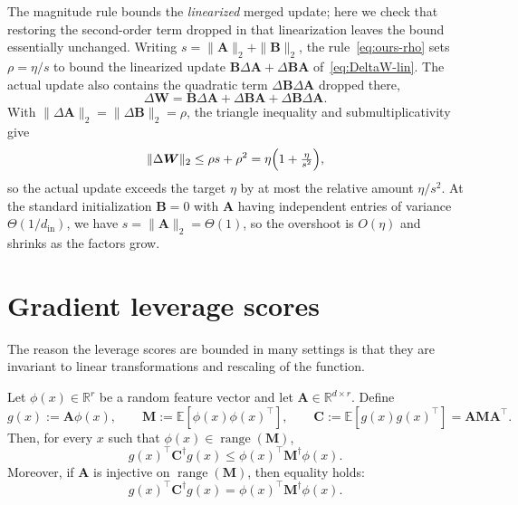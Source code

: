 \documentclass[11pt]{article}
\newcommand{\mat}[1]{\bm{#1}}
\newcommand{\norm}[1]{\| #1\|}
\begin{document}
\begin{remark}
\label{rem:quadratic}
The magnitude rule bounds the \emph{linearized} merged update; here we check that
restoring the second-order term dropped in that linearization leaves the bound
essentially unchanged. Writing $s=\norm{\mat{A}}_2+\norm{\mat{B}}_2$, the
rule~\eqref{eq:ours-rho} sets $\rho=\eta/s$ to bound the linearized update
$\mat{B}\Delta\mat{A}+\Delta\mat{B} \mat{A}$ of~\eqref{eq:DeltaW-lin}. The actual update also contains
the quadratic term $\Delta\mat{B}\Delta\mat{A}$ dropped there,
\[
  \Delta\mat{W} = \mat{B}\Delta\mat{A}+\Delta\mat{B} \mat{A}+\Delta\mat{B}\Delta\mat{A} .
\]
With $\norm{\Delta\mat{A}}_2=\norm{\Delta\mat{B}}_2=\rho$, the triangle inequality and
submultiplicativity give
\[
  \norm{\Delta\mat{W}}_2\le\rho s+\rho^2=\eta\Bigl(1+\tfrac{\eta}{s^2}\Bigr),
\]
so the actual update exceeds the target $\eta$ by at most the relative amount
$\eta/s^2$. At the standard initialization $\mat{B}=0$ with $\mat{A}$ having independent
entries of variance $\Theta(1/d_{\mathrm{in}})$, we have $s=\norm{\mat{A}}_2=\Theta(1)$,
so the overshoot is $O(\eta)$ and shrinks as the factors grow.
\end{remark}




\section{Gradient leverage scores} \label{asec:grad-leverage}


The reason the leverage scores are bounded in many settings is that they are invariant to linear transformations and rescaling of the function.

\begin{lemma} \label{lem:leverage-linearmap}
Let $\phi(x)\in\mathbb{R}^r$ be a random feature vector and let
$\mat{A}\in\mathbb{R}^{d\times r}$. Define
\[
    g(x) := \mat{A}\phi(x),
    \qquad
    \mat{M} := \mathbb{E}[\phi(x)\phi(x)^\top],
    \qquad
    \mat{C} := \mathbb{E}[g(x)g(x)^\top] = \mat{A}\mat{M}\mat{A}^\top.
\]
Then, for every $x$ such that $\phi(x)\in\operatorname{range}(\mat{M})$,
\[
    g(x)^\top \mat{C}^\dagger g(x)
    \leq
    \phi(x)^\top \mat{M}^\dagger \phi(x).
\]
Moreover, if $\mat{A}$ is injective on $\operatorname{range}(\mat{M})$, then equality
holds:
\[
    g(x)^\top \mat{C}^\dagger g(x)
    =
    \phi(x)^\top \mat{M}^\dagger \phi(x).
\]
\end{lemma}
\end{document}
